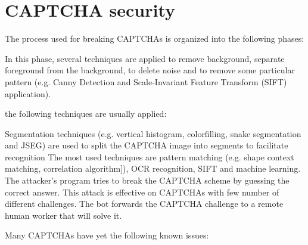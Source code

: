 \section{CAPTCHA security}\label{soa:security_CAPTCHAs}
The process used for breaking CAPTCHAs is organized into the following phases\cite{CAPTCHA_attack_process}:
\begin{enumerate}
{In this phase, several techniques are applied to remove background, separate foreground from the background, to delete noise and to remove some particular pattern (e.g. Canny Detection and Scale-Invariant Feature Transform (SIFT) application).
}
{the following techniques are usually applied:
\begin{itemize}
{Segmentation techniques (e.g. vertical histogram, colorfilling, snake segmentation and JSEG) are used to split the CAPTCHA image into segments to facilitate recognition}
{The most used techniques are pattern matching (e.g. shape context matching, correlation algorithm]), OCR recognition, SIFT and machine learning.}
{The attacker's program tries to break the CAPTCHA scheme by guessing the correct answer. This attack is effective on CAPTCHAs with few number of different challenges.}
{The bot forwards the CAPTCHA challenge to a remote human worker that will solve it.}
\end{itemize}
}
\end{enumerate}
Many CAPTCHAs have yet the following known issues:
